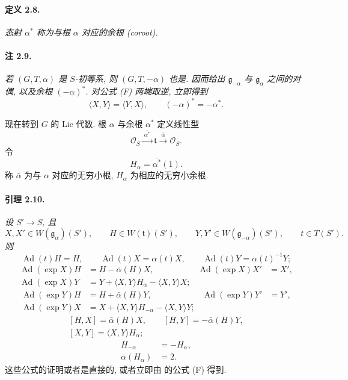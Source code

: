 \paragraph{\textbf{定义 2.8.}}
\emph{态射 \(\alpha^\ast\) 称为与根 \(\alpha\) 对应的余根 (coroot).}

\paragraph{\textbf{注 2.9.}}
\emph{若 \((G,T,\alpha)\) 是 \(S\)-初等系, 则 \((G,T,-\alpha)\) 也是.  因而给出 \(\mathfrak g_{-\alpha}\) 与 \(\mathfrak g_\alpha\) 之间的对偶, 以及余根 \((-\alpha)^\ast\). 对公式 \textup{(F)} 两端取逆, 立即得到}
\[
  \langle X,Y\rangle=\langle Y,X\rangle,
  \qquad
  (-\alpha)^\ast=-\alpha^\ast.
\]

现在转到 \(G\) 的 Lie 代数. 根 \(\alpha\) 与余根 \(\alpha^\ast\) 定义线性型
\[
  \mathscr O_S\xrightarrow{\ \overline{\alpha^\ast}\ }
    \mathfrak t\xrightarrow{\ \bar\alpha\ }\mathscr O_S.
\]
令
\[
  H_\alpha=\overline{\alpha^\ast}(1).
\]
称 \(\bar\alpha\) 为与 \(\alpha\) 对应的无穷小根, \(H_\alpha\) 为相应的无穷小余根.

\paragraph{\textbf{引理 2.10.}}
\emph{设 \(S'\to S\), 且}
\[
  X,X'\in W(\mathfrak g_\alpha)(S'),\qquad
  H\in W(\mathfrak t)(S'),\qquad
  Y,Y'\in W(\mathfrak g_{-\alpha})(S'),\qquad
  t\in T(S').
\]
\emph{则}
\[
\tag{1}\label{sga3:xx:lemma:2-10:equation:1}
  \operatorname{Ad}(t)H=H,\qquad
  \operatorname{Ad}(t)X=\alpha(t)X,\qquad
  \operatorname{Ad}(t)Y=\alpha(t)^{-1}Y;
\]
\[
  \tag{2}\label{sga3:xx:lemma:2-10:equation:2}
\begin{aligned}
  \operatorname{Ad}(\exp X)H
    &=H-\bar\alpha(H)X,&
  \operatorname{Ad}(\exp X)X'&=X',\\
  \operatorname{Ad}(\exp X)Y
    &=Y+\langle X,Y\rangle H_\alpha
        -\langle X,Y\rangle X;
\end{aligned}
\]
\[
  \tag{2'}\label{sga3:xx:lemma:2-10:equation:2-prime}
\begin{aligned}
  \operatorname{Ad}(\exp Y)H
    &=H+\bar\alpha(H)Y,&
  \operatorname{Ad}(\exp Y)Y'&=Y',\\
  \operatorname{Ad}(\exp Y)X
    &=X+\langle X,Y\rangle H_{-\alpha}
        -\langle X,Y\rangle Y;
\end{aligned}
\]
\[
\tag{3}\label{sga3:xx:lemma:2-10:equation:3}
\begin{gathered}
  [H,X]=\bar\alpha(H)X,\qquad
  [H,Y]=-\bar\alpha(H)Y,\\
  [X,Y]=\langle X,Y\rangle H_\alpha;
\end{gathered}
\]
\begin{align}
  H_{-\alpha}&=-H_\alpha, \tag{4}\label{sga3:xx:lemma:2-10:equation:4}\\
  \bar\alpha(H_\alpha)&=2. \tag{5}\label{sga3:xx:lemma:2-10:equation:5}
\end{align}
这些公式的证明或者是直接的, 或者立即由  的公式 \textup{(F)} 得到.

